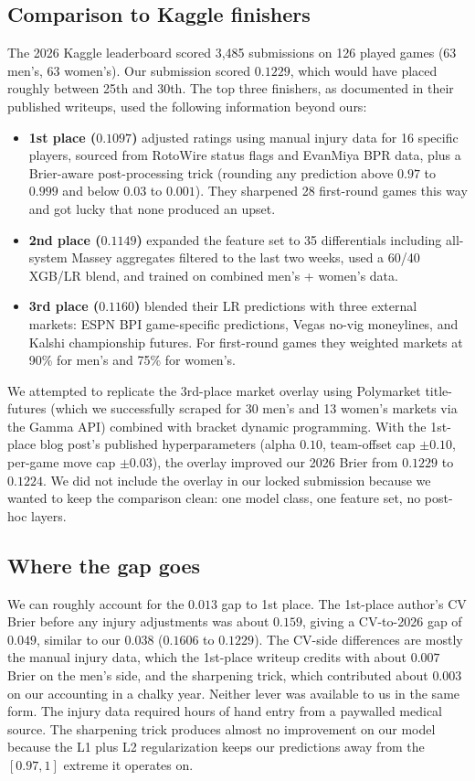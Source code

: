 \documentclass[11pt,a4paper]{article}
\theoremstyle{definition}
\begin{document}
\subsection{Comparison to Kaggle finishers}

The 2026 Kaggle leaderboard scored 3{,}485 submissions on 126 played games (63 men's, 63 women's). Our submission scored $0.1229$, which would have placed roughly between 25th and 30th. The top three finishers, as documented in their published writeups, used the following information beyond ours:

\begin{itemize}[leftmargin=*,itemsep=0pt]
\item \textbf{1st place ($0.1097$)} adjusted ratings using manual injury data for 16 specific players, sourced from RotoWire status flags and EvanMiya BPR data, plus a Brier-aware post-processing trick (rounding any prediction above $0.97$ to $0.999$ and below $0.03$ to $0.001$). They sharpened 28 first-round games this way and got lucky that none produced an upset.
\item \textbf{2nd place ($0.1149$)} expanded the feature set to 35 differentials including all-system Massey aggregates filtered to the last two weeks, used a 60/40 XGB/LR blend, and trained on combined men's + women's data.
\item \textbf{3rd place ($0.1160$)} blended their LR predictions with three external markets: ESPN BPI game-specific predictions, Vegas no-vig moneylines, and Kalshi championship futures. For first-round games they weighted markets at 90\% for men's and 75\% for women's.
\end{itemize}

We attempted to replicate the 3rd-place market overlay using Polymarket title-futures (which we successfully scraped for 30 men's and 13 women's markets via the Gamma API) combined with bracket dynamic programming. With the 1st-place blog post's published hyperparameters (alpha $0.10$, team-offset cap $\pm 0.10$, per-game move cap $\pm 0.03$), the overlay improved our 2026 Brier from $0.1229$ to $0.1224$. We did not include the overlay in our locked submission because we wanted to keep the comparison clean: one model class, one feature set, no post-hoc layers.

\subsection{Where the gap goes}

We can roughly account for the $0.013$ gap to 1st place. The 1st-place author's CV Brier before any injury adjustments was about $0.159$, giving a CV-to-2026 gap of $0.049$, similar to our $0.038$ ($0.1606$ to $0.1229$). The CV-side differences are mostly the manual injury data, which the 1st-place writeup credits with about $0.007$ Brier on the men's side, and the sharpening trick, which contributed about $0.003$ on our accounting in a chalky year. Neither lever was available to us in the same form. The injury data required hours of hand entry from a paywalled medical source. The sharpening trick produces almost no improvement on our model because the L1 plus L2 regularization keeps our predictions away from the $[0.97, 1]$ extreme it operates on.
\end{document}
